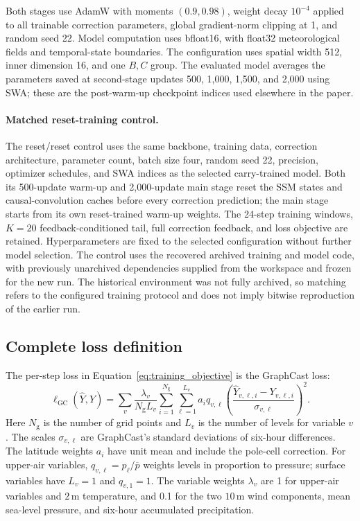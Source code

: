 \documentclass{article}
\newcommand{\vfourchange}[1]{{\color{blue}#1}}
\begin{document}
\vfourchange{Both stages use AdamW with moments $(0.9,0.98)$, weight decay $10^{-4}$ applied to all trainable correction parameters, global gradient-norm clipping at 1, and random seed 22. Model computation uses bfloat16, with float32 meteorological fields and temporal-state boundaries.} The configuration uses spatial width 512, inner dimension 16, and one $B,C$ group. \vfourchange{The evaluated model averages the parameters saved at second-stage updates 500, 1,000, 1,500, and 2,000 using SWA; these are the post-warm-up checkpoint indices used elsewhere in the paper.}

\paragraph{\vfourchange{Matched reset-training control.}}

\vfourchange{The reset/reset control uses the same backbone, training data, correction architecture, parameter count, batch size four, random seed 22, precision, optimizer schedules, and SWA indices as the selected carry-trained model. Both its 500-update warm-up and 2,000-update main stage reset the SSM states and causal-convolution caches before every correction prediction; the main stage starts from its own reset-trained warm-up weights. The 24-step training windows, $K=20$ feedback-conditioned tail, full correction feedback, and loss objective are retained. Hyperparameters are fixed to the selected configuration without further model selection. The control uses the recovered archived training and model code, with previously unarchived dependencies supplied from the workspace and frozen for the new run. The historical environment was not fully archived, so matching refers to the configured training protocol and does not imply bitwise reproduction of the earlier run.}

\subsection{Complete loss definition}
\label{app:training_loss}
The per-step loss in Equation~\ref{eq:training_objective} is the {GraphCast loss}:
\begin{equation}
    \ell_{\mathrm{GC}}(\hat{Y},Y)
    =\sum_v\frac{\lambda_v}{N_{\mathrm{g}}L_v}
      \sum_{i=1}^{N_{\mathrm{g}}}\sum_{\ell=1}^{L_v}
      a_i q_{v,\ell}
      \left(\frac{\hat{Y}_{v,\ell,i}-Y_{v,\ell,i}}
      {\sigma_{v,\ell}}\right)^2.
    \label{eq:training_gc_loss}
\end{equation}
Here $N_{\mathrm{g}}$ is the number of grid points and $L_v$ is the number of levels for variable $v$. The scales $\sigma_{v,\ell}$ are GraphCast's standard deviations of six-hour differences. The latitude weights $a_i$ have unit mean and include the pole-cell correction. For upper-air variables, $q_{v,\ell}=p_\ell/\overline{p}$ weights levels in proportion to pressure; surface variables have $L_v=1$ and $q_{v,1}=1$. The variable weights $\lambda_v$ are 1 for upper-air variables and $2$\,m temperature, and 0.1 for the two $10$\,m wind components, mean sea-level pressure, and six-hour accumulated precipitation.
\end{document}
